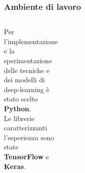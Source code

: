\documentclass{beamer}
\begin{document}
\begin{frame}
	\frametitle{Ambiente di lavoro}
	\begin{columns}
		Per l’implementazione e la sperimentazione delle tecniche e dei modelli 
		di deep-learning è stato scelto \textbf{Python}.\\
		Le librerie caratterizzanti l’esperienza sono state
		\textbf{TensorFlow} e \textbf{Keras}.
		\centering
		\begin{figure}
			\includegraphics[width=0.8\textwidth]{figures/python.PNG}
		\end{figure}
		\begin{figure}
			\includegraphics[width=0.8\textwidth]{figures/index.PNG}
		\end{figure} 
		\begin{figure}
			\includegraphics[width=0.8\textwidth]{figures/matplotlib.JPG}
		\end{figure} 
		\begin{figure}
		\includegraphics[width=0.5\textwidth]{keras-tf.jpg}
		\end{figure}



\end{columns}
\end{frame}
\end{document}
